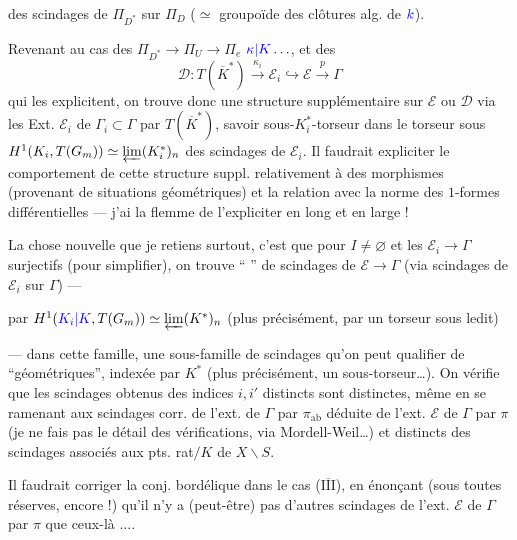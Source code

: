 

des scindages de $\Pi_{D^*}$  sur $\Pi_D$ ($\simeq$ groupoïde des clôtures alg. de $\textcolor{blue}{k}$).

Revenant au cas des  $\Pi_{D^*}\to\Pi_U\to\Pi_e$ $\textcolor{blue}{\kappa|K}\ldots$, et des 
\[
\mathcal{D}:T(\overline{K}^*)\xrightarrow{\kappa_i}\mathcal{E}_i\hookrightarrow\mathcal{E}\xrightarrow{p}\Gamma
\]
qui les explicitent, on trouve donc une structure supplémentaire sur $\mathcal{E}$ ou $\mathcal{D}$ via  les Ext. $\mathcal{E}_i$ de $\Gamma_i\subset\Gamma$ par $T(\overline{K}^*)$, savoir   sous-$K_i^*$-torseur dans le torseur sous
$H^1(K_i,T(G_m))\simeq\varprojlim(K_i^*)_n$ des  scindages de $\mathcal{E}_i$.
Il faudrait expliciter le comportement de cette structure suppl. relativement à des morphismes (provenant de situations géométriques) et la relation avec la norme des $1$-formes différentielles --- j'ai la flemme de l'expliciter en long et en large !

La chose nouvelle que je retiens surtout, c'est que pour $I\ne\varnothing$ et les $\mathcal{E}_i\to\Gamma$ surjectifs (pour simplifier), on trouve   `` '' de scindages de $\mathcal{E}\to\Gamma$ (via scindages de $\mathcal{E}_i$ sur $\Gamma$) ---  



par $H^1(\textcolor{blue}{K_i|K},T(G_m))\simeq\varprojlim(K^*)_n$ (plus précisément, par un torseur sous ledit)

--- dans cette famille, une sous-famille de scindages qu'on peut qualifier de ``géométriques'', indexée par $K^*$ (plus précisément, un sous-torseur\ldots).
On vérifie que les scindages obtenus  des indices $i,i'$ distincts sont distinctes, même en se ramenant aux \unsure{$\pi$-}scindages corr. de l'ext. de $\Gamma$ par $\pi_{\mathrm{ab}}$ déduite de l'ext. $\mathcal{E}$ de $\Gamma$ par $\pi$ (je ne fais pas le détail des vérifications, via Mordell-Weil\ldots) et distincts des scindages associés aux pts. rat$/K$ de $X\backslash S$.

Il faudrait corriger la conj. bordélique dans le cas (\uline{$\overline{\mathrm{III}}$}), en énonçant (sous toutes réserves, encore !) qu'il n'y a (peut-être) pas d'autres scindages de l'ext. $\mathcal{E}$ de $\Gamma$ par $\pi$ que ceux-là ....

